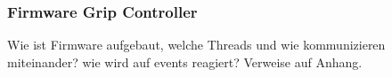 \documentclass[main.tex]{subfiles} %
\begin{document}

\subsubsection{Firmware Grip Controller}

Wie ist Firmware aufgebaut, welche Threads und wie kommunizieren miteinander?
wie wird auf events reagiert? Verweise auf Anhang.
\end{document}
